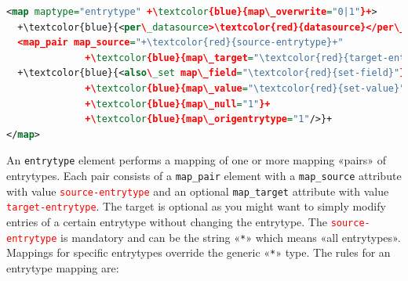 \documentclass{ltxdockit}
\begin{document}

\lstset{showspaces=false,showstringspaces=false}
\begin{lstlisting}[language=xml,escapechar=+,mathescape=true]
<map maptype="entrytype" +\textcolor{blue}{map\_overwrite="0|1"}+>
  +\textcolor{blue}{<per\_datasource>\textcolor{red}{datasource}</per\_datasource>}+
  <map_pair map_source="+\textcolor{red}{source-entrytype}+"
              +\textcolor{blue}{map\_target="\textcolor{red}{target-entrytype}"}+/>
  +\textcolor{blue}{<also\_set map\_field="\textcolor{red}{set-field}"}+
              +\textcolor{blue}{map\_value="\textcolor{red}{set-value}"}+
              +\textcolor{blue}{map\_null="1"}+
              +\textcolor{blue}{map\_origentrytype="1"/>}+
</map>
\end{lstlisting}

\noindent An \verb+entrytype+ element performs a mapping of one or more
mapping «pairs» of entrytypes. Each pair consists of a \verb+map_pair+
element with a \verb+map_source+ attribute with value
\textcolor{red}{\texttt{source-entrytype}} and an optional
\verb+map_target+ attribute with value
\textcolor{red}{\texttt{target-entrytype}}. The target is
optional as you might want to simply modify entries of a certain entrytype
without changing the entrytype. The
\textcolor{red}{\texttt{source-entrytype}} is mandatory and can be the
string «\verb+*+» which means «all entrytypes». Mappings for specific
entrytypes override the generic «\verb+*+» type. The
rules for an entrytype mapping are:\\[1ex]
\end{document}
